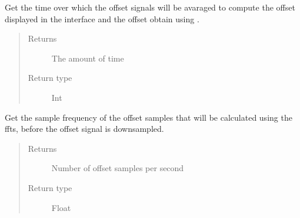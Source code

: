 \documentclass[letterpaper,10pt,english]{sphinxmanual}
\begin{document}
\begin{fulllineitems}
\begin{fulllineitems}
\label{\detokenize{index:TiePieLCR_settings.TiePieLCR_settings.get_offset_integration_time}}
\sphinxAtStartPar
Get the time over which the offset signals will be avaraged to compute the offset displayed in the interface and the offset obtain using .
\begin{quote}\begin{description}
\item[{Returns}] \leavevmode
\sphinxAtStartPar
The amount of time

\item[{Return type}] \leavevmode
\sphinxAtStartPar
Int

\end{description}\end{quote}

\end{fulllineitems}


\begin{fulllineitems}
\label{\detokenize{index:TiePieLCR_settings.TiePieLCR_settings.get_offset_sample_frequency}}
\sphinxAtStartPar
Get the sample frequency of the offset samples that will be calculated using the ffts, before the offset signal is downsampled.
\begin{quote}\begin{description}
\item[{Returns}] \leavevmode
\sphinxAtStartPar
Number of offset samples per second

\item[{Return type}] \leavevmode
\sphinxAtStartPar
Float

\end{description}\end{quote}

\end{fulllineitems}



\end{fulllineitems}
\end{document}

